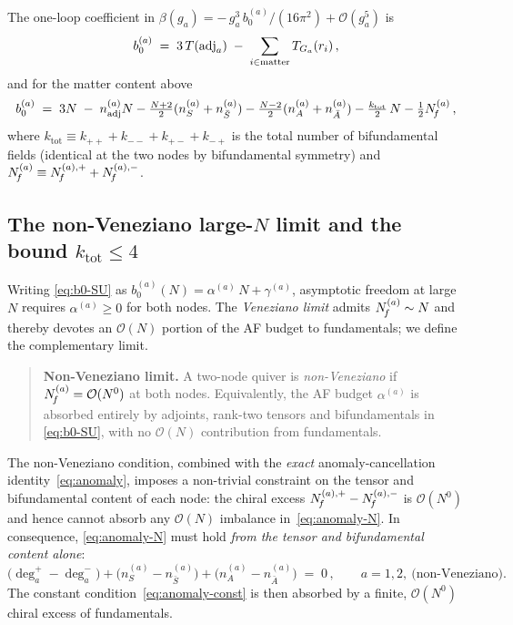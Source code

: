 The one-loop coefficient in
$\beta(g_{a})=-\,g_{a}^{3}\,b_{0}^{(a)}/(16\pi^{2})+\mathcal O(g_{a}^{5})$ is
\begin{equation}
  b_{0}^{(a)}\;=\;3\,T(\mathrm{adj}_{a})\;-\;\sum_{i\in\text{matter}}T_{G_{a}}(r_{i})\,,
  \label{eq:b0}
\end{equation}
and for the matter content above
\begin{equation}
  b_{0}^{(a)}\;=\;3N\;-\;n_{\mathrm{adj}}^{(a)}N
  -\tfrac{N+2}{2}(n_{S}^{(a)}+n_{\bar S}^{(a)})
  -\tfrac{N-2}{2}(n_{A}^{(a)}+n_{\bar A}^{(a)})
  -\tfrac{k_{\text{tot}}}{2}\,N
  -\tfrac{1}{2}N_{\!f}^{(a)}\,,
  \label{eq:b0-SU}
\end{equation}
where
$k_{\text{tot}}\equiv k_{++}+k_{--}+k_{+-}+k_{-+}$ is the total number
of bifundamental fields (identical at the two nodes by bifundamental
symmetry) and $N_{\!f}^{(a)}\equiv N_{\!f}^{(a),+}+N_{\!f}^{(a),-}$.

\subsection{The non-Veneziano large-$N$ limit and the bound $k_{\text{tot}}\le 4$}
\label{sec:setup-largeN}

Writing \eqref{eq:b0-SU} as
$b_{0}^{(a)}(N)=\alpha^{(a)}\,N+\gamma^{(a)}$, asymptotic freedom at
large $N$ requires $\alpha^{(a)}\ge 0$ for both nodes.  The
\emph{Veneziano limit} admits $N_{\!f}^{(a)}\sim N$ and thereby devotes an
$\mathcal O(N)$ portion of the AF budget to fundamentals; we define the
complementary limit.

\begin{quote}
  \textbf{Non-Veneziano limit.}  A two-node quiver is
  \emph{non-Veneziano} if $N_{\!f}^{(a)}=\mathcal O(N^{0})$ at both nodes.
  Equivalently, the AF budget $\alpha^{(a)}$ is absorbed entirely by
  adjoints, rank-two tensors and bifundamentals in \eqref{eq:b0-SU},
  with no $\mathcal O(N)$ contribution from fundamentals.
\end{quote}

The non-Veneziano condition, combined with the \emph{exact}
anomaly-cancellation identity~\eqref{eq:anomaly}, imposes a
non-trivial constraint on the tensor and bifundamental content of
each node: the chiral excess
$N_{\!f}^{(a),+}-N_{\!f}^{(a),-}$ is $\mathcal O(N^{0})$ and hence cannot
absorb any $\mathcal O(N)$ imbalance in~\eqref{eq:anomaly-N}.  In
consequence, \eqref{eq:anomaly-N} must hold \emph{from the tensor
and bifundamental content alone}:
\begin{equation}
  \bigl(\deg^{+}_{a}-\deg^{-}_{a}\bigr)
   +\bigl(n_{S}^{(a)}-n_{\bar S}^{(a)}\bigr)
   +\bigl(n_{A}^{(a)}-n_{\bar A}^{(a)}\bigr)\;=\;0\,,
  \qquad a=1,2,\ \text{(non-Veneziano).}
  \label{eq:anomaly-N-nonVen}
\end{equation}
The constant condition~\eqref{eq:anomaly-const} is then absorbed by
a finite, $\mathcal O(N^{0})$ chiral excess of fundamentals.

